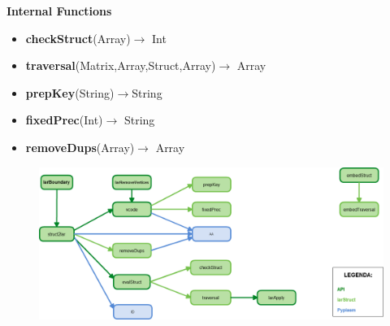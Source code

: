 \documentclass[a4paper,12pt]{article}
\begin{document}
\textbf{Internal Functions} 
\begin{itemize}
\item \textbf{checkStruct}(Array)$\rightarrow$ Int 
\item \textbf{traversal}(Matrix,Array,Struct,Array)$\rightarrow$ Array
\item \textbf{prepKey}(String)$\rightarrow$String 
\item \textbf{fixedPrec}(Int)$\rightarrow$ String
\item \textbf{removeDups}(Array)$\rightarrow$ Array
\end{itemize}
\begin{figure}[h!]
\includegraphics[width=17cm, scale=0.5]{larStruct.png}
\end{figure}
\newpage
\end{document}
